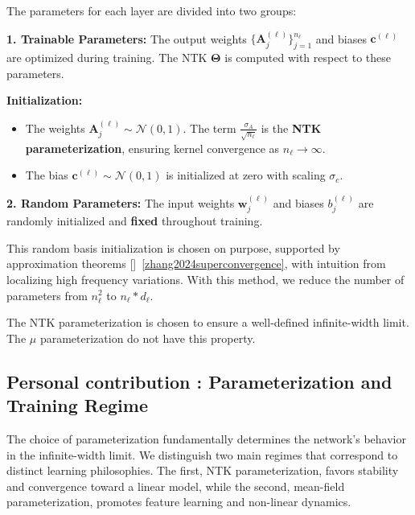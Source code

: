 \documentclass[11pt]{article}
\newcommand{\Kop}{\boldsymbol{\Theta}}
\begin{document}
\begin{tcolorbox}[colback=blue!15,colframe=blue!80!black,title={\textbf{Remark : Parameter Classification}},enhanced,drop shadow,boxrule=2pt]
The parameters for each layer are divided into two groups:

\textbf{1. Trainable Parameters:} The output weights $\{\bm{A}_j^{(\ell)}\}_{j=1}^{n_\ell}$ and biases $\bm{c}^{(\ell)}$ are optimized during training. The NTK $\Kop $ is computed with respect to these parameters.

\textbf{Initialization:}
\begin{itemize}
\item The weights $\bm{A}_j^{(\ell)} \sim \mathcal{N}(0, 1)$. The term $\frac{\sigma_A}{\sqrt{n_\ell}}$ is the \textbf{NTK parameterization}, ensuring kernel convergence as $n_\ell \to \infty$.
\item The bias $\bm{c}^{(\ell)} \sim \mathcal{N}(0, 1)$ is initialized at zero with scaling $\sigma_c$.
\end{itemize}

\textbf{2. Random Parameters:} The input weights $\bm{w}_j^{(\ell)}$ and biases $b_j^{(\ell)}$ are randomly initialized and \textbf{fixed} throughout training.
\end{tcolorbox}



\begin{tcolorbox}[colback=green!5,colframe=green!80!black,title={\textbf{Insight : Architectural Philosophy}},enhanced,drop shadow,boxrule=2pt]
This random basis initialization is chosen on purpose, supported by approximation theorems []~\ref{zhang2024superconvergence}, with intuition from localizing high frequency variations.
With this method, we reduce the number of parameters from $n_\ell^2$ to $n_\ell * d_\ell$.

The NTK parameterization is chosen to ensure a well-defined infinite-width limit. The $\mu$ parameterization do not have this property.
\end{tcolorbox}



\subsection{Personal contribution : Parameterization and Training Regime}

The choice of parameterization fundamentally determines the network's behavior in the infinite-width limit. We distinguish two main regimes that correspond to distinct learning philosophies. The first, NTK parameterization, favors stability and convergence toward a linear model, while the second, mean-field parameterization, promotes feature learning and non-linear dynamics.
\end{document}
